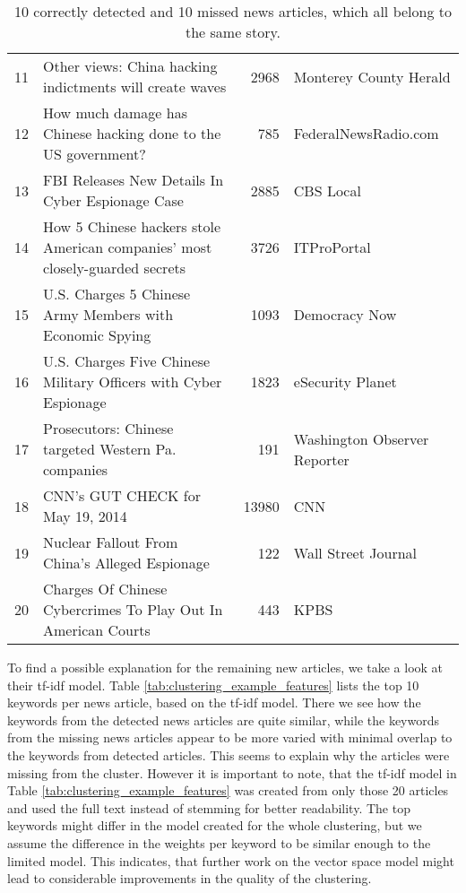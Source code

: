 \begin{table}[h]
{\begin{tabular}{rlrl}
            \hline
                11 & Other views: China hacking indictments will create waves                     &          2968 & Monterey County Herald       \\
                12 & How much damage has Chinese hacking done to the US government?               &           785 & FederalNewsRadio.com         \\
                13 & FBI Releases New Details In Cyber Espionage Case                             &          2885 & CBS Local                    \\
                14 & How 5 Chinese hackers stole American companies' most closely-guarded secrets &          3726 & ITProPortal                  \\
                15 & U.S. Charges 5 Chinese Army Members with Economic Spying                     &          1093 & Democracy Now                \\
                16 & U.S. Charges Five Chinese Military Officers with Cyber Espionage             &          1823 & eSecurity Planet             \\
                17 & Prosecutors: Chinese targeted Western Pa. companies                          &           191 & Washington Observer Reporter \\
                18 & CNN's GUT CHECK for May 19, 2014                                             &         13980 & CNN                  \\
                19 & Nuclear Fallout From China's Alleged Espionage                               &           122 & Wall Street Journal \\
                20 & Charges Of Chinese Cybercrimes To Play Out In American Courts                &           443 & KPBS               \\
                \hline
        \end{tabular}
    }
    \caption{10 correctly detected and 10 missed news articles, which all belong to the same story.}
    \label{tab:clustering_example}
\end{table}

To find a possible explanation for the remaining new articles, we take a look at their tf-idf model. Table \ref{tab:clustering_example_features} lists the top 10 keywords per news article, based on the tf-idf model. There we see how the keywords from the detected news articles are quite similar, while the keywords from the missing news articles appear to be more varied with minimal overlap to the keywords from detected articles. This seems to explain why the articles were missing from the cluster. However it is important to note, that the tf-idf model in Table \ref{tab:clustering_example_features} was created from only those 20 articles and used the full text instead of stemming for better readability. The top keywords might differ in the model created for the whole clustering, but we assume the difference in the weights per keyword to be similar enough to the limited model. This indicates, that further work on the vector space model might lead to considerable improvements in the quality of the clustering.

